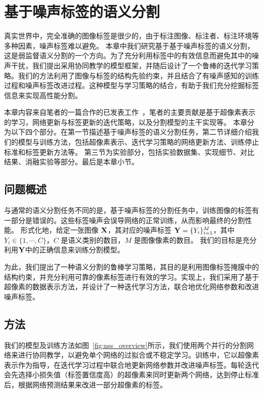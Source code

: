 \chapter{基于噪声标签的语义分割}

真实世界中，完全准确的图像标签是很少的，由于标注图像、标注者、标注环境等多种因素，噪声标签难以避免。
本章中我们研究基于基于噪声标签的语义分割，这是弱监督语义分割的一个方向。为了充分利用标签中的有效信息而避免其中的噪声干扰，我们提出采用协同教学的模型框架，并随后设计了一个鲁棒的迭代学习策略。我们的方法利用了图像与标签的结构先验约束，并且结合了有噪声感知的训练过程和噪声标签改进过程。这种模型与学习策略的结合，有助于我们充分挖掘标签信息来实现高性能分割。

本章内容来自笔者的一篇合作的已发表工作~\cite{li2021superpixel}，笔者的主要贡献是基于超像素表示的学习，网络更新与标签更新的迭代策略，以及分割模型的主干实现等。
本章分为以下四个部分。在第一节描述基于噪声标签的语义分割任务，第二节详细介绍我们的模型与训练方法，包括超像素表示、迭代学习策略的网络更新方法、训练停止标准和标签更新方法等。
第三节为实验部分，包括实验数据集、实现细节、对比结果、消融实验等部分。最后是本章小节。

\section{问题概述}
与通常的语义分割任务不同的是，基于噪声标签的分割任务中，训练图像的标签有一部分是错误的。这些标签噪声会误导网络的正常训练，从而影响最终的分割性能。
形式化地，给定一张图像 $\mathbf{X}$，其对应的噪声标签 $\mathbf{Y}=\{Y_i\}_{i=1}^M$，其中 $Y_i\in\{1,\cdots, C\}$，$C$ 是语义类别的数目，$M$ 是图像像素的数目。
我们的目标是充分利用$\mathbf{Y}$中的正确信息来训练分割模型。

为此，我们提出了一种语义分割的鲁棒学习策略，其目的是利用图像标签掩膜中的结构约束，并充分利用可靠的像素标签进行有效的学习。实现上，我们采用了基于超像素的数据表示方法，并设计了一种迭代学习方法，联合地优化网络参数和改进噪声标签。

\section{方法}
我们的模型及训练方法如图~\ref{fig:nss_overview}所示，我们使用两个并行的分割网络来进行协同教学，以避免单个网络的过拟合或不稳定学习。训练中，它以超像素表示作为指导，在迭代学习过程中联合地更新网络参数并改进噪声标签。每轮迭代会先选择小损失值（标签置信度高）的超像素来同时更新两个网络，达到停止标准后，根据网络预测结果来改进一部分超像素的标签。

